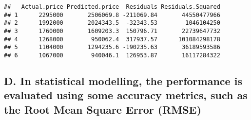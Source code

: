 \documentclass[
]{article}
\newenvironment{Shaded}{\begin{snugshade}}{\end{snugshade}}
\newcommand{\DecValTok}[1]{\textcolor[rgb]{0.00,0.00,0.81}{#1}}
\newcommand{\FunctionTok}[1]{\textcolor[rgb]{0.13,0.29,0.53}{\textbf{#1}}}
\newcommand{\NormalTok}[1]{#1}
\newcommand{\OtherTok}[1]{\textcolor[rgb]{0.56,0.35,0.01}{#1}}
\newcommand{\SpecialCharTok}[1]{\textcolor[rgb]{0.81,0.36,0.00}{\textbf{#1}}}
\newcommand{\StringTok}[1]{\textcolor[rgb]{0.31,0.60,0.02}{#1}}
\begin{document}
\begin{Shaded}
\end{Shaded}

\begin{verbatim}
##   Actual.price Predicted.price  Residuals Residuals.Squared
## 1      2295000       2506069.8 -211069.84       44550477966
## 2      1992000       2024343.5  -32343.53        1046104250
## 3      1760000       1609203.3  150796.71       22739647732
## 4      1268000        950062.4  317937.57      101084298178
## 5      1104000       1294235.6 -190235.63       36189593586
## 6      1067000        940046.1  126953.87       16117284322
\end{verbatim}

\subsection{D. In statistical modelling, the performance is evaluated
using some accuracy metrics, such as the Root Mean Square Error
(RMSE)}\label{d.-in-statistical-modelling-the-performance-is-evaluated-using-some-accuracy-metrics-such-as-the-root-mean-square-error-rmse}

\begin{Shaded}
\end{Shaded}
\end{document}
